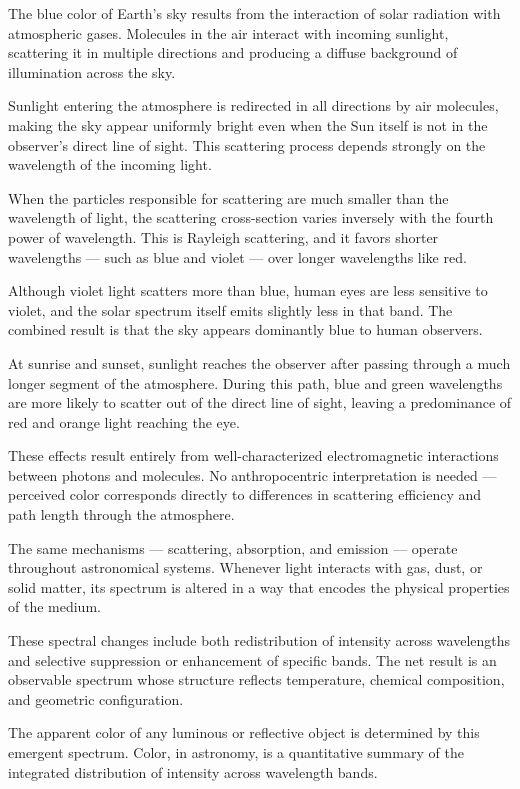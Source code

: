 The blue color of Earth's sky results from the interaction of solar radiation with atmospheric gases. Molecules in the air interact with incoming sunlight, scattering it in multiple directions and producing a diffuse background of illumination across the sky.

Sunlight entering the atmosphere is redirected in all directions by air molecules, making the sky appear uniformly bright even when the Sun itself is not in the observer's direct line of sight. This scattering process depends strongly on the wavelength of the incoming light.

When the particles responsible for scattering are much smaller than the wavelength of light, the scattering cross-section varies inversely with the fourth power of wavelength. This is Rayleigh scattering, and it favors shorter wavelengths --- such as blue and violet --- over longer wavelengths like red.

Although violet light scatters more than blue, human eyes are less sensitive to violet, and the solar spectrum itself emits slightly less in that band. The combined result is that the sky appears dominantly blue to human observers.

At sunrise and sunset, sunlight reaches the observer after passing through a much longer segment of the atmosphere. During this path, blue and green wavelengths are more likely to scatter out of the direct line of sight, leaving a predominance of red and orange light reaching the eye.

These effects result entirely from well-characterized electromagnetic interactions between photons and molecules. No anthropocentric interpretation is needed --- perceived color corresponds directly to differences in scattering efficiency and path length through the atmosphere.

The same mechanisms --- scattering, absorption, and emission --- operate throughout astronomical systems. Whenever light interacts with gas, dust, or solid matter, its spectrum is altered in a way that encodes the physical properties of the medium.

These spectral changes include both redistribution of intensity across wavelengths and selective suppression or enhancement of specific bands. The net result is an observable spectrum whose structure reflects temperature, chemical composition, and geometric configuration.

The apparent color of any luminous or reflective object is determined by this emergent spectrum. Color, in astronomy, is a quantitative summary of the integrated distribution of intensity across wavelength bands.

